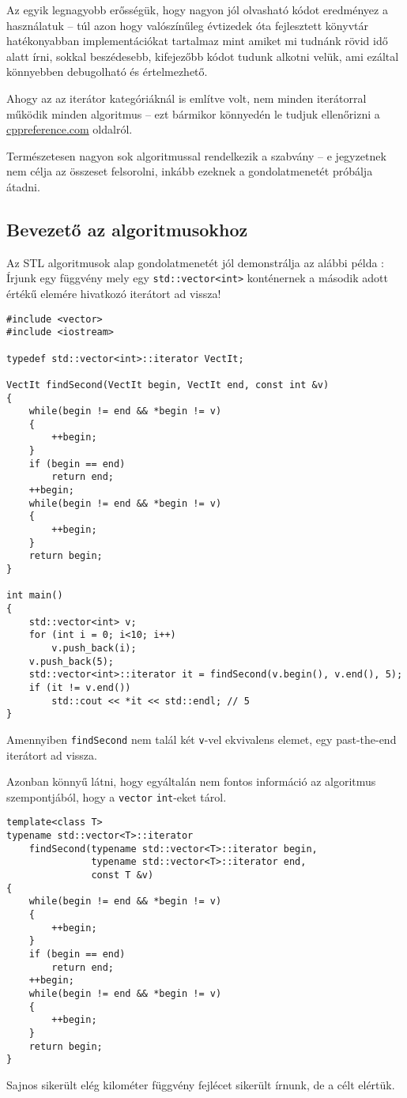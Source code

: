 \documentclass[a4paper,11.5pt,table]{article}
\begin{document}
	Az egyik legnagyobb erősségük, hogy nagyon jól olvasható kódot eredményez a használatuk -- túl azon hogy valószínűleg évtizedek óta fejlesztett könyvtár hatékonyabban implementációkat tartalmaz mint amiket mi tudnánk rövid idő alatt írni, sokkal beszédesebb, kifejezőbb kódot tudunk alkotni velük, ami ezáltal könnyebben debugolható és értelmezhető.
	
	Ahogy az az iterátor kategóriáknál is említve volt, nem minden iterátorral működik minden algoritmus -- ezt bármikor könnyedén le tudjuk ellenőrizni a \url{cppreference.com} oldalról.
	\begin{note}
		Természetesen nagyon sok algoritmussal rendelkezik a szabvány -- e jegyzetnek nem célja az összeset felsorolni, inkább ezeknek a gondolatmenetét próbálja átadni.
	\end{note}
	\subsection{Bevezető az algoritmusokhoz}
	
	Az STL algoritmusok alap gondolatmenetét jól demonstrálja az alábbi példa : Írjunk egy függvény mely egy \texttt{std::vector<int>} konténernek a második adott értékű elemére hivatkozó iterátort ad vissza!
	\begin{lstlisting}
#include <vector>
#include <iostream>

typedef std::vector<int>::iterator VectIt;

VectIt findSecond(VectIt begin, VectIt end, const int &v)
{
	while(begin != end && *begin != v)
	{
		++begin;
	}
	if (begin == end)
		return end;
	++begin;
	while(begin != end && *begin != v)
	{
		++begin;
	}
	return begin;
}

int main()
{
	std::vector<int> v;
	for (int i = 0; i<10; i++)
		v.push_back(i);
	v.push_back(5);
	std::vector<int>::iterator it = findSecond(v.begin(), v.end(), 5);
	if (it != v.end())
		std::cout << *it << std::endl; // 5
}
	\end{lstlisting}
	Amennyiben \texttt{findSecond} nem talál két \texttt{v}-vel ekvivalens elemet, egy past-the-end iterátort ad vissza.
	
	\smallskip
	Azonban könnyű látni, hogy egyáltalán nem fontos információ az algoritmus szempontjából, hogy a \texttt{vector} \texttt{int}-eket tárol.
	\begin{lstlisting}
template<class T>
typename std::vector<T>::iterator 
	findSecond(typename std::vector<T>::iterator begin, 
			   typename std::vector<T>::iterator end, 
			   const T &v)
{
	while(begin != end && *begin != v)
	{
		++begin;
	}
	if (begin == end)
		return end;
	++begin;
	while(begin != end && *begin != v)
	{
		++begin;
	}
	return begin;
}
	\end{lstlisting}
	Sajnos sikerült elég kilométer függvény fejlécet sikerült írnunk, de a célt elértük.
	
\end{document}
